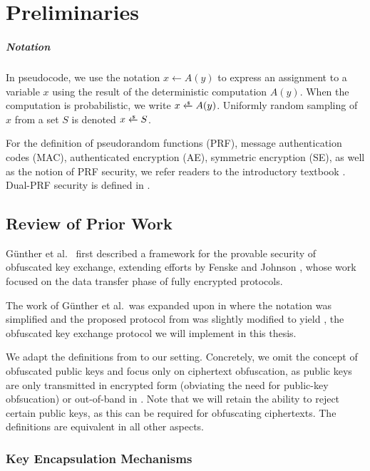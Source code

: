 \chapter{Preliminaries}\label{ch:preliminaries}

\paragraph{Notation}
In pseudocode, we use the notation $x \gets A(y)$ to express an assignment to a variable $x$ using the result of the deterministic computation $A(y)$. When the computation is probabilistic, we write $x \getsr A(y)$.
Uniformly random sampling of $x$ from a set $S$ is denoted $x \getsr S$.

For the definition of pseudorandom functions (PRF), message authentication codes (MAC), authenticated encryption (AE), symmetric encryption (SE), as well as the notion of PRF security, we refer readers to the introductory textbook \cite{katz_lindell}.
Dual-PRF security is defined in \cite[Section~7.1]{CCS:GunSteVei24}.

\section{Review of Prior Work} \label{sec:review-gsv24}

Günther et al.~\cite{CCS:GunSteVei24} first described a framework for the provable security of obfuscated key exchange, extending efforts by Fenske and Johnson \cite{CCS:FenJoh24}, whose work focused on the data transfer phase of fully encrypted protocols.

The work of Günther et al.~was expanded upon in \cite{EPRINT:GRSV25} where the notation was simplified and the proposed protocol from \cite{CCS:GunSteVei24} was slightly modified to yield \drivel{}, the obfuscated key exchange protocol we will implement in this thesis.

We adapt the definitions from \cite{CCS:GunSteVei24,EPRINT:GRSV25} to our setting. Concretely, we omit the concept of obfuscated public keys and focus only on ciphertext obfuscation, as public keys are only transmitted in encrypted form (obviating the need for public-key obfsucation) or out-of-band in \drivel{}. Note that we will retain the ability to reject certain public keys, as this can be required for obfuscating ciphertexts. The definitions are equivalent in all other aspects.

\subsection{Key Encapsulation Mechanisms}

